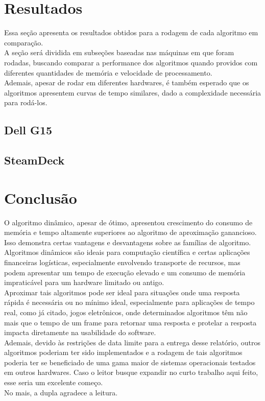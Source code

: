 \documentclass{article}
\begin{document}
\section{Resultados} %
    Essa seção apresenta os resultados obtidos para a rodagem de cada algoritmo em comparação.\\
    A seção será dividida em subseções baseadas nas máquinas em que foram rodadas, buscando comparar
    a performance dos algoritmos quando providos com diferentes quantidades de memória e velocidade de processamento.\\
    Ademais, apesar de rodar em diferentes hardwares, é também esperado que os algoritmos apresentem curvas de tempo similares, dado a complexidade necessária para rodá-los.

    \subsection{Dell G15}
    \subsection{SteamDeck}

\section{Conclusão}
    O algoritmo dinâmico, apesar de ótimo, apresentou crescimento do consumo de memória e tempo altamente superiores ao algoritmo de aproximação ganancioso. Isso demonstra certas vantagens e desvantagens sobre as famílias de algoritmo.\\
    Algoritmos dinâmicos são ideais para computação científica e certas aplicações financeiras logísticas, especialmente envolvendo transporte de recursos, mas podem apresentar um tempo de execução elevado e um consumo de memória impraticável para um hardware limitado ou antigo.\\
    Aproximar tais algoritmos pode ser ideal para situações onde uma resposta rápida é necessária ou no mínimo ideal, especialmente para aplicações de tempo real, como já citado, jogos eletrônicos, onde determinados algoritmos têm não mais que o tempo de um frame para retornar uma resposta e protelar a resposta impacta diretamente na usabilidade do software.\\
    Ademais, devido às restrições de data limite para a entrega desse relatório, outros algoritmos poderiam ter sido implementados e a rodagem de tais algoritmos poderia ter se beneficiado de uma gama maior de sistemas operacionais testados em outros hardwares. Caso o leitor busque expandir no curto trabalho aqui feito, esse seria um excelente começo.\\
    No mais, a dupla agradece a leitura. 
\end{document}
